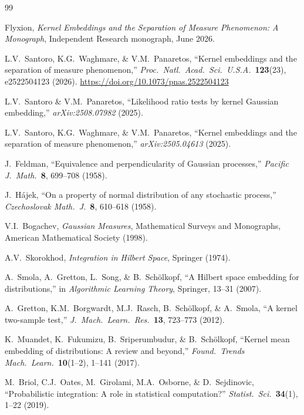 \documentclass[12pt, oneside]{book}
\theoremstyle{plain}
\theoremstyle{definition}
\begin{document}
\begin{thebibliography}{99}

Flyxion,
\textit{Kernel Embeddings and the Separation of Measure Phenomenon: A Monograph},
Independent Research monograph, June 2026.

L.V.~Santoro, K.G.~Waghmare, \& V.M.~Panaretos,
``Kernel embeddings and the separation of measure phenomenon,''
\textit{Proc.\ Natl.\ Acad.\ Sci.\ U.S.A.}\ \textbf{123}(23), e2522504123 (2026).
\url{https://doi.org/10.1073/pnas.2522504123}

L.V.~Santoro \& V.M.~Panaretos,
``Likelihood ratio tests by kernel Gaussian embedding,''
\textit{arXiv:2508.07982} (2025).

L.V.~Santoro, K.G.~Waghmare, \& V.M.~Panaretos,
``Kernel embeddings and the separation of measure phenomenon,''
\textit{arXiv:2505.04613} (2025).

J.~Feldman,
``Equivalence and perpendicularity of Gaussian processes,''
\textit{Pacific J.\ Math.}\ \textbf{8}, 699--708 (1958).

J.~H\'ajek,
``On a property of normal distribution of any stochastic process,''
\textit{Czechoslovak Math.\ J.}\ \textbf{8}, 610--618 (1958).

V.I.~Bogachev,
\textit{Gaussian Measures},
Mathematical Surveys and Monographs, American Mathematical Society (1998).

A.V.~Skorokhod,
\textit{Integration in Hilbert Space},
Springer (1974).

A.~Smola, A.~Gretton, L.~Song, \& B.~Sch\"olkopf,
``A Hilbert space embedding for distributions,''
in \textit{Algorithmic Learning Theory}, Springer, 13--31 (2007).

A.~Gretton, K.M.~Borgwardt, M.J.~Rasch, B.~Sch\"olkopf, \& A.~Smola,
``A kernel two-sample test,''
\textit{J.\ Mach.\ Learn.\ Res.}\ \textbf{13}, 723--773 (2012).

K.~Muandet, K.~Fukumizu, B.~Sriperumbudur, \& B.~Sch\"olkopf,
``Kernel mean embedding of distributions: A review and beyond,''
\textit{Found.\ Trends Mach.\ Learn.}\ \textbf{10}(1--2), 1--141 (2017).

M.~Briol, C.J.~Oates, M.~Girolami, M.A.~Osborne, \& D.~Sejdinovic,
``Probabilistic integration: A role in statistical computation?''
\textit{Statist.\ Sci.}\ \textbf{34}(1), 1--22 (2019).


\end{thebibliography}
\end{document}
